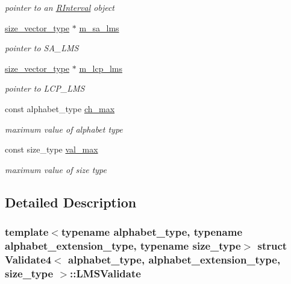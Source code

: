\begin{DoxyCompactItemize}
\begin{DoxyCompactList}\small\item\em pointer to an \hyperlink{struct_validate4_1_1_l_m_s_validate_1_1_r_interval}{R\+Interval} object \end{DoxyCompactList}\item 
\hyperlink{class_validate4_a46ea31a0a4b23f583806792160421d15}{size\+\_\+vector\+\_\+type} $\ast$ \hyperlink{struct_validate4_1_1_l_m_s_validate_a789edc9840b1d8af636e4f07127ac333}{m\+\_\+sa\+\_\+lms}
\begin{DoxyCompactList}\small\item\em pointer to S\+A\+\_\+\+L\+MS \end{DoxyCompactList}\item 
\hyperlink{class_validate4_a46ea31a0a4b23f583806792160421d15}{size\+\_\+vector\+\_\+type} $\ast$ \hyperlink{struct_validate4_1_1_l_m_s_validate_a6ce0f5fd88cd24e81c85faad0c1d64d5}{m\+\_\+lcp\+\_\+lms}
\begin{DoxyCompactList}\small\item\em pointer to L\+C\+P\+\_\+\+L\+MS \end{DoxyCompactList}\item 
const alphabet\+\_\+type \hyperlink{struct_validate4_1_1_l_m_s_validate_a3e640263256e534dcf3da45f50ef0645}{ch\+\_\+max}
\begin{DoxyCompactList}\small\item\em maximum value of alphabet type \end{DoxyCompactList}\item 
const size\+\_\+type \hyperlink{struct_validate4_1_1_l_m_s_validate_a8dce0e079545d3c4f2649614053cf5f1}{val\+\_\+max}
\begin{DoxyCompactList}\small\item\em maximum value of size type \end{DoxyCompactList}\end{DoxyCompactItemize}


\subsection{Detailed Description}
\subsubsection*{template$<$typename alphabet\+\_\+type, typename alphabet\+\_\+extension\+\_\+type, typename size\+\_\+type$>$\newline
struct Validate4$<$ alphabet\+\_\+type, alphabet\+\_\+extension\+\_\+type, size\+\_\+type $>$\+::\+L\+M\+S\+Validate}

